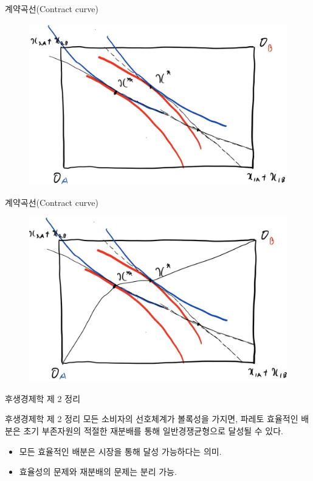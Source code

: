 \documentclass[aspectratio=169,xcolor=dvipsnames,handout]{beamer}
\begin{document}
\begin{frame}{계약곡선(Contract curve)}
    \begin{figure}
        \centering
        \includegraphics[scale=.3]{pic/contract1.jpg}
    \end{figure}
\end{frame}

\begin{frame}{계약곡선(Contract curve)}
    \begin{figure}
        \centering
        \includegraphics[scale=.3]{pic/contract2.jpg}
    \end{figure}
\end{frame}
\begin{frame}{후생경제학 제 2 정리}
    \begin{block}{후생경제학 제 2 정리}
        모든 소비자의 선호체계가 볼록성을 가지면, 파레토 효율적인 배분은 초기 부존자원의 적절한 재분배를 통해 일반경쟁균형으로 달성될 수 있다.
    \end{block}
    \begin{itemize}
        \item 모든 효율적인 배분은 시장을 통해 달성 가능하다는 의미.
        \item 효율성의 문제와 재분배의 문제는 분리 가능. 
    \end{itemize}
\end{frame}
\end{document}

